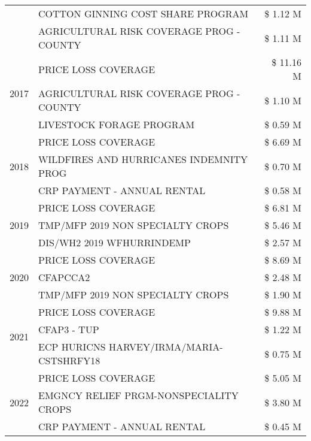 \begin{tabular}{llr}
 & COTTON GINNING COST SHARE PROGRAM & \$ 1.12 M \\
 & AGRICULTURAL RISK COVERAGE PROG - COUNTY & \$ 1.11 M \\
\cline{1-3}
\multirow[t]{3}{*}{2017} & PRICE LOSS COVERAGE & \$ 11.16 M \\
 & AGRICULTURAL RISK COVERAGE PROG - COUNTY & \$ 1.10 M \\
 & LIVESTOCK FORAGE PROGRAM & \$ 0.59 M \\
\cline{1-3}
\multirow[t]{3}{*}{2018} & PRICE LOSS COVERAGE & \$ 6.69 M \\
 & WILDFIRES AND HURRICANES INDEMNITY PROG & \$ 0.70 M \\
 & CRP PAYMENT - ANNUAL RENTAL & \$ 0.58 M \\
\cline{1-3}
\multirow[t]{3}{*}{2019} & PRICE LOSS COVERAGE & \$ 6.81 M \\
 & TMP/MFP 2019 NON SPECIALTY CROPS & \$ 5.46 M \\
 & DIS/WH2 2019 WFHURRINDEMP & \$ 2.57 M \\
\cline{1-3}
\multirow[t]{3}{*}{2020} & PRICE LOSS COVERAGE & \$ 8.69 M \\
 & CFAPCCA2 & \$ 2.48 M \\
 & TMP/MFP 2019 NON SPECIALTY CROPS & \$ 1.90 M \\
\cline{1-3}
\multirow[t]{3}{*}{2021} & PRICE LOSS COVERAGE & \$ 9.88 M \\
 & CFAP3 - TUP & \$ 1.22 M \\
 & ECP HURICNS HARVEY/IRMA/MARIA-CSTSHRFY18 & \$ 0.75 M \\
\cline{1-3}
\multirow[t]{3}{*}{2022} & PRICE LOSS COVERAGE & \$ 5.05 M \\
 & EMGNCY RELIEF PRGM-NONSPECIALITY CROPS & \$ 3.80 M \\
 & CRP PAYMENT - ANNUAL RENTAL & \$ 0.45 M \\
\cline{1-3}
\bottomrule
\end{tabular}
